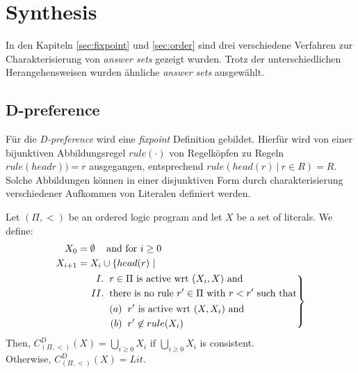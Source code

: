 \section{Synthesis}

In den Kapiteln \ref{sec:fixpoint} und \ref{sec:order} sind drei verschiedene
Verfahren zur Charakterisierung von \emph{answer sets} gezeigt wurden.
Trotz der unterschiedlichen Herangehensweisen wurden ähnliche
\emph{answer sets} ausgewählt.

\subsection{D-preference}
Für die \emph{D-preference} wird eine \emph{fixpoint} Definition gebildet.
Hierfür wird von einer bijunktiven Abbildungsregel $rule(\cdot)$ von
Regelköpfen zu Regeln $rule(headr)) = r$ ausgegangen, entsprechend
$rule({head(r)~|~r \in R}) = R$. Solche Abbildungen können in einer
disjunktiven Form durch charakterisierung verschiedener Aufkommen
von Literalen definiert werden.

\begin{definition}
  Let $(\Pi, <)$ be an ordered logic program and let $X$ be a set of literals.
  We define:\\
  \begin{equation*}
    \begin{split}
      X_0 & = \emptyset\hspace*{0.3cm} \text{~and for~} i \geq 0 \\
      X_{i+1} & = X_i \cup \{ head(r)~| \\
        & \hspace*{0.4cm}\left. \begin{aligned}
          I. &\hspace*{0.2cm} r \in \Pi \text{~is active wrt~} (X_i, X) \text{~and} \\
          II. &\hspace*{0.2cm} \text{there is no rule~} r' \in \Pi \text{~with~} r < r'
          \text{~such that} \\
          & \hspace*{0.2cm} \begin{aligned}
            (a) &\hspace*{0.2cm} r' \text{~is active wrt~} (X, X_i) \text{~and} \\
            (b) &\hspace*{0.2cm} r' \not\in rule(X_i)
          \end{aligned}
        \end{aligned}
      \right \}
    \end{split}
  \end{equation*}
  Then, $C^D_{(\Pi, <)}(X) = \bigcup_{i\geq 0} X_i$ if $\bigcup_{i\geq 0} X_i$ is
  consistent. \\Otherwise, $C^D_{(\Pi, <)}(X) = Lit$.
  \label{def:fix_d}
\end{definition}

